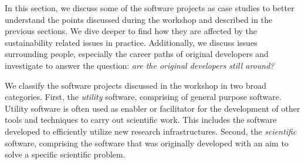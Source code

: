 \documentclass[11pt, oneside]{amsart}
\begin{document}







In this section, we discuss some of the software projects as case
studies to better understand the points discussed during the workshop
and described in the previous sections. We dive deeper to find how 
they are affected by the sustainability related issues in
practice. Additionally, we discuss issues surrounding people,
especially the career paths of original developers and investigate to
answer the question: \emph{are the original developers still around?}

We classify the software projects discussed in the workshop in two
broad categories. First, the \emph{utility} software, comprising of
general purpose software. Utility software is often used as enabler
or facilitator for the development of other tools and techniques
to carry out scientific work. This includes the software developed to
efficiently utilize new research infrastructures. Second, the
\emph{scientific} software, comprising the software that was
originally developed with an aim to solve a specific scientific
problem.
\end{document}
